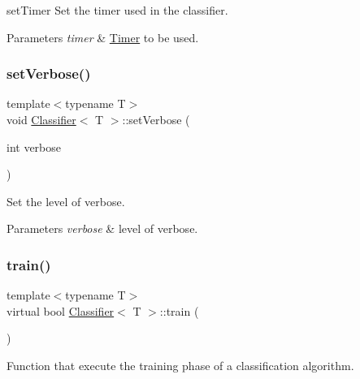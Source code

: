 set\+Timer Set the timer used in the classifier. 


\begin{DoxyParams}{Parameters}
{\em timer} & \mbox{\hyperlink{class_timer}{Timer}} to be used. \\
\hline
\end{DoxyParams}
\mbox{\label{class_classifier_ac9e142714dff18a8caa5c9e3d7cfcbfc}} 
\subsubsection{\texorpdfstring{set\+Verbose()}{setVerbose()}}
{\footnotesize\ttfamily template$<$typename T$>$ \\
void \mbox{\hyperlink{class_classifier}{Classifier}}$<$ T $>$\+::set\+Verbose (\begin{DoxyParamCaption}\item[{int}]{verbose }\end{DoxyParamCaption})\hspace{0.3cm}{\ttfamily [inline]}}



Set the level of verbose. 


\begin{DoxyParams}{Parameters}
{\em verbose} & level of verbose. \\
\hline
\end{DoxyParams}
\mbox{\label{class_classifier_a120849bfdfa3ba7a0388b32b2d76bf4f}} 
\subsubsection{\texorpdfstring{train()}{train()}}
{\footnotesize\ttfamily template$<$typename T$>$ \\
virtual bool \mbox{\hyperlink{class_classifier}{Classifier}}$<$ T $>$\+::train (\begin{DoxyParamCaption}{ }\end{DoxyParamCaption})\hspace{0.3cm}{\ttfamily [pure virtual]}}



Function that execute the training phase of a classification algorithm. 

